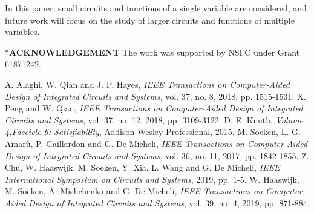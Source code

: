\documentclass[conference,letterpaper]{IEEEtran}
\makeatletter
\renewcommand{\section}{\@startsection{section}{1}{0mm}
    {-\baselineskip}{0.001\baselineskip}{\bf\leftline}}
\makeatother
\begin{document}
In this paper, small circuits and functions of a single variable are considered, and future work will focus on the study of larger circuits and functions of multiple variables.

\section*{\textbf{\large ACKNOWLEDGEMENT}} \vspace{-0ex}
The work was supported by NSFC under Grant 61871242.

\small
\begin{thebibliography}{10}
A. Alaghi, W. Qian and J. P. Hayes, \emph{IEEE Transactions on Computer-Aided Design of Integrated Circuits and Systems}, vol. 37, no. 8, 2018, pp. 1515-1531.
X. Peng and W. Qian, \emph{IEEE Transactions on Computer-Aided Design of Integrated Circuits and Systems}, vol. 37, no. 12, 2018, pp. 3109-3122.
D. E. Knuth, \emph{Volume 4,Fascicle 6: Satisfiability}, Addison-Wesley Professional, 2015.
M. Soeken, L. G. Amarù, P. Gaillardon and G. De Micheli, \emph{IEEE Transactions on Computer-Aided Design of Integrated Circuits and Systems}, vol. 36, no. 11, 2017, pp. 1842-1855.
Z. Chu, W. Haaswijk, M. Soeken, Y. Xia, L. Wang and G. De Micheli, \emph{IEEE International Symposium on Circuits and Systems}, 2019, pp. 1-5.
W. Haaswijk, M. Soeken, A. Mishchenko and G. De Micheli, \emph{IEEE Transactions on Computer-Aided Design of Integrated Circuits and Systems}, vol. 39, no. 4, 2019, pp. 871-884.
\end{thebibliography}

%
\end{document}
